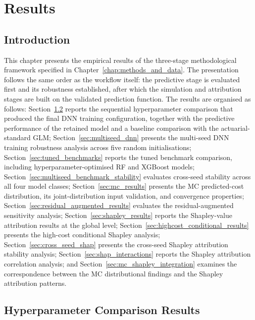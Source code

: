 \section{Results}
\label{sec:results}

\subsection{Introduction}
\label{sec:chapter4_introduction}

This chapter presents the empirical results of the three-stage
methodological framework specified in Chapter~\ref{chap:methods_and_data}.
The presentation follows the same order as the workflow itself: the
predictive stage is evaluated first and its robustness established,
after which the simulation and attribution stages are built on the
validated prediction function.
The results are organised as follows:
Section~\ref{sec:hyperparameter_results} reports the sequential
hyperparameter comparison that produced the final DNN training
configuration, together with the predictive performance of the retained
model and a baseline comparison with the actuarial-standard GLM;
Section~\ref{sec:multiseed_dnn} presents the multi-seed DNN
training robustness analysis across five random initialisations;
Section~\ref{sec:tuned_benchmarks} reports the tuned benchmark
comparison, including hyperparameter-optimised RF and
XGBoost models;
Section~\ref{sec:multiseed_benchmark_stability} evaluates cross-seed
stability across all four model classes;
Section~\ref{sec:mc_results} presents the MC
predicted-cost distribution, its joint-distribution input validation,
and convergence properties;
Section~\ref{sec:residual_augmented_results} evaluates the
residual-augmented sensitivity analysis;
Section~\ref{sec:shapley_results} reports the Shapley-value attribution
results at the global level;
Section~\ref{sec:highcost_conditional_results} presents the high-cost
conditional Shapley analysis;
Section~\ref{sec:cross_seed_shap} presents the cross-seed Shapley
attribution stability analysis;
Section~\ref{sec:shap_interactions} reports the Shapley attribution
correlation analysis; and
Section~\ref{sec:mc_shapley_integration} examines the correspondence
between the MC distributional findings and the Shapley
attribution patterns.


\subsection{Hyperparameter Comparison Results}
\label{sec:hyperparameter_results}


